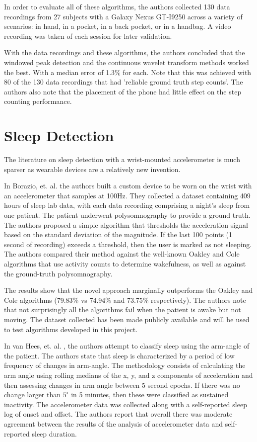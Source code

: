                 In order to evaluate all of these algorithms, the authors collected 130 data recordings from 27 subjects with a Galaxy Nexus GT-I9250 across a variety of scenarios: in hand, in a pocket, in a back pocket, or in a handbag. A video recording was taken of each session for later validation.

                With the data recordings and these algorithms, the authors concluded that the windowed peak detection and the continuous wavelet transform methods worked the best. With a median error of 1.3\% for each. Note that this was achieved with 80 of the 130 data recordings that had 'reliable ground truth step counts'. The authors also note that the placement of the phone had little effect on the step counting performance. 


        \section{Sleep Detection}

            The literature on sleep detection with a wrist-mounted accelerometer is much sparser as wearable devices are a relatively new invention. 

            In Borazio, et. al. \cite{borazio} the authors built a custom device to be worn on the wrist with an accelerometer that samples at 100Hz. They collected a dataset containing 409 hours of sleep lab data, with each data recording comprising a night's sleep from one patient. The patient underwent polysomnography to provide a ground truth. The authors proposed a simple algorithm that thresholds the acceleration signal based on the standard deviation of the magnitude. If the last 100 points (1 second of recording) exceeds a threshold, then the user is marked as not sleeping. The authors compared their method against the well-known Oakley \cite{oakley} and Cole \cite{cole} algorithms that use activity counts to determine wakefulness, as well as against the ground-truth polysomnography. 

            The results show that the novel approach marginally outperforms the Oakley and Cole algorithms (79.83\% vs 74.94\% and 73.75\% respectively). The authors note that not surprisingly all the algorithms fail when the patient is awake but not moving. The dataset collected has been made publicly available and will be used to test algorithms developed in this project.

            In van Hees, et. al. \cite{vanhees}, the authors attempt to classify sleep using the arm-angle of the patient. The authors state that sleep is characterized by a period of low frequency of changes in arm-angle. The methodology consists of calculating the arm angle using rolling medians of the x, y, and z components of acceleration and then assessing changes in arm angle between 5 second epochs. If there was no change larger than $5^{\circ}$ in 5 minutes, then these were classified as sustained inactivity. The accelerometer data was collected along with a self-reported sleep log of onset and offset. The authors report that overall there was moderate agreement between the results of the analysis of accelerometer data and self-reported sleep duration.